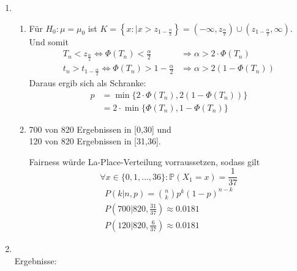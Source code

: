 \documentclass[a4paper]{scrartcl}
\def \blattnr {9}
\begin{document}
\begin{enumerate}[label=\bfseries \blattnr.\arabic*]
    \item 
      \begin{enumerate}
       \item Für $H_0: \mu = \mu_0$ ist 
       $K = \left\{x:|x>z_{1-\frac\alpha 2} \right\} = \left(-\infty, z_{\frac\alpha 2}\right) \cup \left(z_{1-\frac\alpha 2}, \infty \right)$. Und somit
	\begin{equation*}
	  \begin{split}
	    T_n<z_{\frac\alpha 2} \Leftrightarrow \Phi(T_n)<\frac\alpha 2 &\Rightarrow \alpha > 2\cdot \Phi(T_n) \\
	    t_n>t_{1-\frac\alpha 2} \Leftrightarrow \Phi(T_n) > 1-\frac\alpha 2 &\Rightarrow \alpha > 2(1-\Phi(T_n))
	  \end{split}
	\end{equation*}
      Daraus ergib sich als Schranke: 
      \begin{equation*}
	  \begin{split}
	    p 
	    &= \min\{2\cdot \Phi(T_n), 2(1-\Phi(T_n))\}  \\
	    &= 2 \cdot \min\{\Phi(T_n), 1-\Phi(T_n)\}
	  \end{split}
	\end{equation*}
       
       \item 
        700 von 820 Ergebnissen in [0,30] und \\
	120 von 820 Ergebnissen in [31,36].
	
	Fairness würde La-Place-Verteilung vorraussetzen, sodass gilt \\
	$$\forall x \in \{0,1,\ldots,36\}: \mathbb{P}(X_1 = x) = \frac1{37}$$
	\begin{equation*}
	  \begin{split}
	    P(k|n,p) = \binom{n}{k} p^ k(1-p)^{n-k} \\
	    P\left(700|820,\frac{31}{37}\right) \approx 0.0181 \\ 
	    P\left(120|820,\frac{6}{37}\right) \approx 0.0181
	  \end{split}
	\end{equation*}
	
      \end{enumerate}

    \pagebreak
    \item \hfill \\ 
      
      
      \pagebreak
      Ergebnisse:
      

\end{enumerate}
\end{document}

